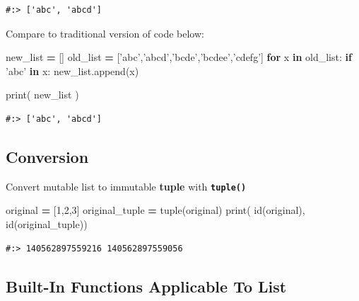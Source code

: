 \documentclass[
]{book}
\newenvironment{Shaded}{\begin{snugshade}}{\end{snugshade}}
\newcommand{\BuiltInTok}[1]{#1}
\newcommand{\ControlFlowTok}[1]{\textcolor[rgb]{0.27,0.27,0.27}{\textbf{#1}}}
\newcommand{\DecValTok}[1]{\textcolor[rgb]{0.06,0.06,0.06}{#1}}
\newcommand{\KeywordTok}[1]{\textcolor[rgb]{0.27,0.27,0.27}{\textbf{#1}}}
\newcommand{\NormalTok}[1]{#1}
\newcommand{\OperatorTok}[1]{\textcolor[rgb]{0.43,0.43,0.43}{\textbf{#1}}}
\newcommand{\StringTok}[1]{\textcolor[rgb]{0.5,0.5,0.5}{#1}}
\begin{document}
\begin{verbatim}
#:> ['abc', 'abcd']
\end{verbatim}

Compare to traditional version of code below:

\begin{Shaded}
\begin{Highlighting}[]
\NormalTok{new_list }\OperatorTok{=}\NormalTok{ []}
\NormalTok{old_list }\OperatorTok{=}\NormalTok{ [}\StringTok{'abc'}\NormalTok{,}\StringTok{'abcd'}\NormalTok{,}\StringTok{'bcde'}\NormalTok{,}\StringTok{'bcdee'}\NormalTok{,}\StringTok{'cdefg'}\NormalTok{]}
\ControlFlowTok{for}\NormalTok{ x }\KeywordTok{in}\NormalTok{ old_list:}
    \ControlFlowTok{if} \StringTok{'abc'} \KeywordTok{in}\NormalTok{ x:}
\NormalTok{        new_list.append(x)}
        
\BuiltInTok{print}\NormalTok{( new_list )}
\end{Highlighting}
\end{Shaded}

\begin{verbatim}
#:> ['abc', 'abcd']
\end{verbatim}

\hypertarget{conversion}{%
\subsection{Conversion}\label{conversion}}

Convert mutable list to immutable \textbf{tuple} with \textbf{\texttt{tuple()}}

\begin{Shaded}
\begin{Highlighting}[]
\NormalTok{original }\OperatorTok{=}\NormalTok{ [}\DecValTok{1}\NormalTok{,}\DecValTok{2}\NormalTok{,}\DecValTok{3}\NormalTok{]}
\NormalTok{original_tuple }\OperatorTok{=} \BuiltInTok{tuple}\NormalTok{(original)}
\BuiltInTok{print}\NormalTok{( }\BuiltInTok{id}\NormalTok{(original),}
       \BuiltInTok{id}\NormalTok{(original_tuple))}
\end{Highlighting}
\end{Shaded}

\begin{verbatim}
#:> 140562897559216 140562897559056
\end{verbatim}

\hypertarget{built-in-functions-applicable-to-list}{%
\subsection{Built-In Functions Applicable To List}\label{built-in-functions-applicable-to-list}}
\end{document}

